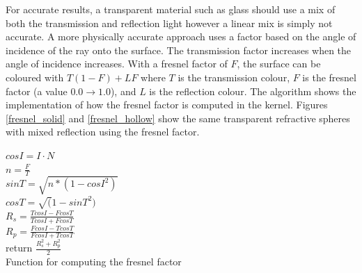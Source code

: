 \documentclass[final]{cmpreport}
\begin{document}
For accurate results, a transparent material such as glass should use a mix of both the transmission and reflection light however a linear mix is simply not accurate. A more physically accurate approach uses a factor based on the angle of incidence of the ray onto the surface. The transmission factor increases when the angle of incidence increases. With a fresnel factor of $F$, the surface can be coloured with $T(1 - F) + LF$ where $T$ is the transmission colour, $F$ is the fresnel factor (a value $0.0 \rightarrow 1.0$), and $L$ is the reflection colour. The algorithm  shows the implementation of how the fresnel factor is computed in the kernel. Figures \ref{fresnel_solid} and \ref{fresnel_hollow} show the same transparent refractive spheres with mixed reflection using the fresnel factor.

\begin{algorithm}
    \label{fresnelalgo}
    \SetAlgoLined

    $cosI = I \cdot N$ \\
    $n = \frac{F}{T}$ \\
    $sinT = \sqrt{n * (1 - cosI^2)}$ \\
    $cosT = \sqrt(1 - sinT^2)$ \\
    $R_s = \frac{TcosI - FcosT}{TcosI + FcosT}$ \\
    $R_p = \frac{FcosI - TcosT}{FcosI + TcosT}$ \\
    return $\frac{R_s^2 + R_p^2}{2}$ \\

    \caption{Function for computing the fresnel factor}
\end{algorithm}
\end{document}
